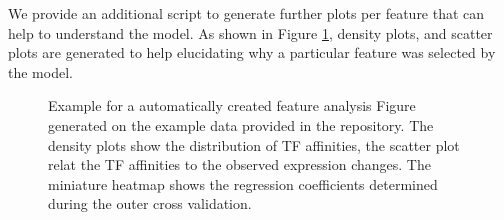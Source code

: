 \documentclass{article}
\begin{document}
We provide an additional script to generate further plots per feature that can help to understand the model. As shown in Figure \ref{ExampleAnalysisOfDynamite},
density plots, and scatter plots are generated to help elucidating why a particular feature was selected by the model.
\begin{figure}[h!]
\centering

\caption{Example for a automatically created feature analysis Figure generated on the example data provided in the repository. The density plots show the distribution of TF affinities, the
scatter plot relat the TF affinities to the observed expression changes. The miniature heatmap shows the regression coefficients determined during the outer cross validation.}
\label{ExampleAnalysisOfDynamite}
\end{figure}

\newpage


\end{document}
